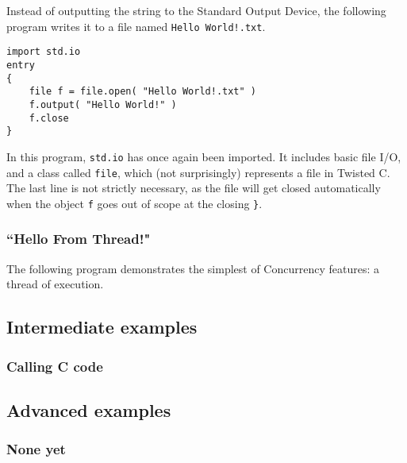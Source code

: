 \documentclass[a4paper,11pt]{article}
\newcommand{\tcode}[1]{\texttt{#1}}
\begin{document}
Instead of outputting the string to the Standard Output Device, the following program writes it to a file named \tcode{Hello World!.txt}.
\begin{lstlisting}
import std.io
entry
{
    file f = file.open( "Hello World!.txt" )
    f.output( "Hello World!" )
    f.close
}
\end{lstlisting}
In this program, \tcode{std.io} has once again been imported.
It includes basic file I/O, and a class called \tcode{file}, which (not surprisingly) represents a file in Twisted C.
The last line is not strictly necessary, as the file will get closed automatically when the object \tcode{f} goes out of scope at the closing \tcode{\}}.

    \subsubsection{``Hello From Thread!"}

The following program demonstrates the simplest of Concurrency features: a thread of execution.

  \subsection{Intermediate examples}
    \subsubsection{Calling C code}

  \subsection{Advanced examples}
    \subsubsection{None yet}
\end{document}

